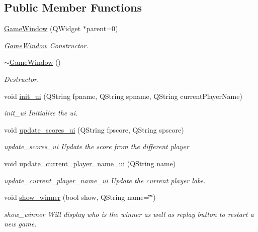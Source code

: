 \subsection*{Public Member Functions}
\begin{DoxyCompactItemize}
\item 
\hyperlink{class_game_window_a016b254d770fc4c2ce4a21a4c6f38fbc}{Game\+Window} (Q\+Widget $\ast$parent=0)
\begin{DoxyCompactList}\small\item\em \hyperlink{class_game_window}{Game\+Window} Constructor. \end{DoxyCompactList}\item 
\mbox{\label{class_game_window_a55b071c0390e45c064a160c1e6baaa08}} 
\hyperlink{class_game_window_a55b071c0390e45c064a160c1e6baaa08}{$\sim$\+Game\+Window} ()
\begin{DoxyCompactList}\small\item\em Destructor. \end{DoxyCompactList}\item 
void \hyperlink{class_game_window_a87e5f249822ac1bd895ad9bcd26a80af}{init\+\_\+ui} (Q\+String fpname, Q\+String spname, Q\+String current\+Player\+Name)
\begin{DoxyCompactList}\small\item\em init\+\_\+ui Initialize the ui. \end{DoxyCompactList}\item 
void \hyperlink{class_game_window_a6cb8a429ac545c93457ad00bd0242af3}{update\+\_\+scores\+\_\+ui} (Q\+String fpscore, Q\+String spscore)
\begin{DoxyCompactList}\small\item\em update\+\_\+scores\+\_\+ui Update the score from the different player \end{DoxyCompactList}\item 
void \hyperlink{class_game_window_a97c9a250fd9010a1ee4b39fef5325af7}{update\+\_\+current\+\_\+player\+\_\+name\+\_\+ui} (Q\+String name)
\begin{DoxyCompactList}\small\item\em update\+\_\+current\+\_\+player\+\_\+name\+\_\+ui Update the current player labe. \end{DoxyCompactList}\item 
void \hyperlink{class_game_window_adfdbef2f1c76091d1a14a07660baeb7f}{show\+\_\+winner} (bool show, Q\+String name=\char`\"{}\char`\"{})
\begin{DoxyCompactList}\small\item\em show\+\_\+winner Will display who is the winner as well as replay button to restart a new game. \end{DoxyCompactList}\item 

\end{DoxyCompactItemize}
